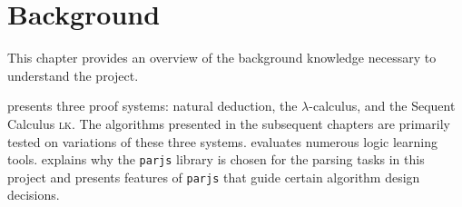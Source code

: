 \chapter{Background}\label{background}
This chapter provides an overview of the background knowledge necessary to understand the project.

 presents three proof systems: natural deduction, the $\lambda$-calculus, and the Sequent Calculus \textsc{lk}. The algorithms presented in the subsequent chapters are primarily tested on variations of these three systems.  evaluates numerous logic learning tools.  explains why the \lstinline{parjs} library is chosen for the parsing tasks in this project and presents features of \lstinline{parjs} that guide certain algorithm design decisions.





